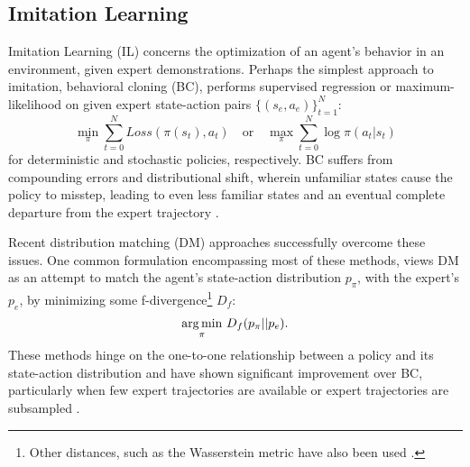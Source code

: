 \subsection{Imitation Learning}
Imitation Learning (IL) concerns the optimization of an agent’s behavior in an environment, given expert demonstrations. Perhaps the simplest approach to imitation, behavioral cloning (BC), performs supervised regression or maximum-likelihood on given expert state-action pairs $\{(s_e,a_e)\}_{t=1}^N$: \begin{equation}\label{eq:bc_objective} {\min_\pi \sum_{t=0}^N Loss(\pi(s_t),a_t)\quad \text{or} \quad \max_\pi \sum_{t=0}^N \log \pi(a_t|s_t)} \end{equation} for deterministic and stochastic policies, respectively. BC suffers from compounding errors and distributional shift, wherein unfamiliar states cause the policy to misstep, leading to even less familiar states and an eventual complete departure from the expert trajectory \cite{ross2011reduction}.

Recent distribution matching (DM) approaches \cite{ho2016generative,kostrikov2018discriminator,kostrikov2019imitation,kim2021imitation} successfully overcome these issues. One common formulation \cite{ke2020imitation, ghasemipour2020divergence} encompassing most of these methods, views DM as an attempt to match the agent's state-action distribution $p_\pi$, with the expert's $p_{e}$, by minimizing some f-divergence\footnote{Other distances, such as the Wasserstein metric have also been used \cite{sun2021softdice,dadashi2020primal}.} $D_f$: 
\begin{equation}\label{eq:Matching}
\operatorname*{arg\,min}_{\pi} \, D_f(p_\pi||p_e).
\end{equation} 
These methods hinge on the one-to-one relationship between a policy and its state-action distribution and have shown significant improvement over BC, particularly when few expert trajectories are available \cite{ghasemipour2020divergence} or expert trajectories are subsampled \cite{li2022rethinking}. 